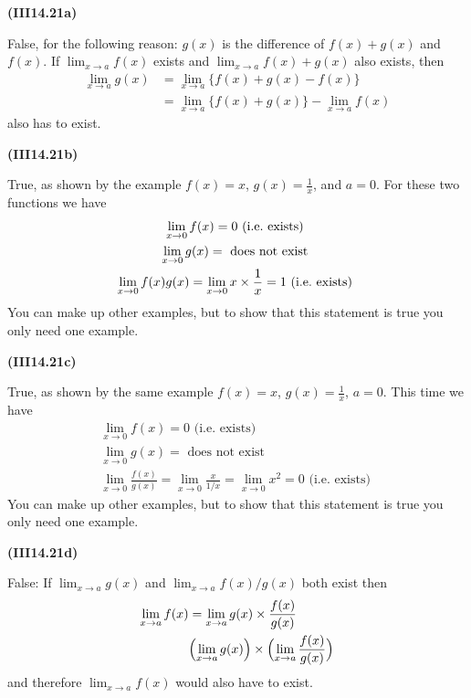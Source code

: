 \documentclass[openany,reqno]{amsbook}
\begin{document}
\begin{trivlist}
\item[{\bf(III14.21a)}]

  False, for the following reason:  $g(x)$ is the difference of $f(x)+g(x)$ and
  $f(x)$.  If $\lim_{x\to a} f(x)$ exists and $\lim_{x\to a} f(x) + g(x)$ also exists, then
  \begin{align*}
    \lim_{x\to a} g(x) &= \lim_{x\to a} \bigl\{f(x) + g(x) - f(x)\bigr\}\\
    &= \lim_{x\to a} \bigl\{f(x) + g(x)\bigr\} - \lim_{x\to a} f(x)
  \end{align*}
  also has to exist.
  \bigskip

\item[{\bf(III14.21b)}]

  True, as shown by the example $f(x) = x$, $g(x) = \frac{1}{x}$, and $a=0$.
  For these two functions we have
  \begin{gather*}
    \lim_{x\to 0} f(x) = 0 \text{ (i.e.\ exists) } \\
    \lim_{x\to 0} g(x) = \text{ does not exist } \\
    \lim_{x\to 0} f(x) g(x) = \lim_{x\to 0} x\times\frac1x = 1 \text{ (i.e.\
    exists) }
  \end{gather*}
  You can make up other examples, but to show that this statement is true you only
  need one example.
  \bigskip

\item[{\bf(III14.21c)}]

  True, as shown by the same example $f(x) = x$, $g(x) = \frac{1}{x}$, $a=0$.
  This time we have
  \begin{gather*}
    \lim_{x\to 0} f(x) = 0 \text{ (i.e.\ exists) } \\
    \lim_{x\to 0} g(x) = \text{ does not exist } \\
    \lim_{x\to 0} \frac{f(x)}{g(x)} = \lim_{x\to 0} \frac{x}{1/x} =\lim_{x\to0}
    x^2 = 0 \text{ (i.e.\ exists) }
  \end{gather*}
  You can make up other examples, but to show that this statement is true you only
  need one example.
  \bigskip

\item[{\bf(III14.21d)}]

  False:  If $\lim_{x\to a} g(x)$ and $\lim_{x\to a} f(x)/g(x)$ both exist then
  \begin{align*}
    \lim_{x\to a} f(x) &=
    \lim_{x\to a} g(x) \times \frac{f(x)}{g(x)} \\
    &\Bigl(\lim_{x\to a} g(x)\Bigr) \times \Bigl(\lim_{x\to a} \frac{f(x)}{g(x)}\Bigr) \\
  \end{align*}
  and therefore $\lim_{x\to a} f(x)$ would also have to exist.
  \bigskip


\end{trivlist}
\end{document}
